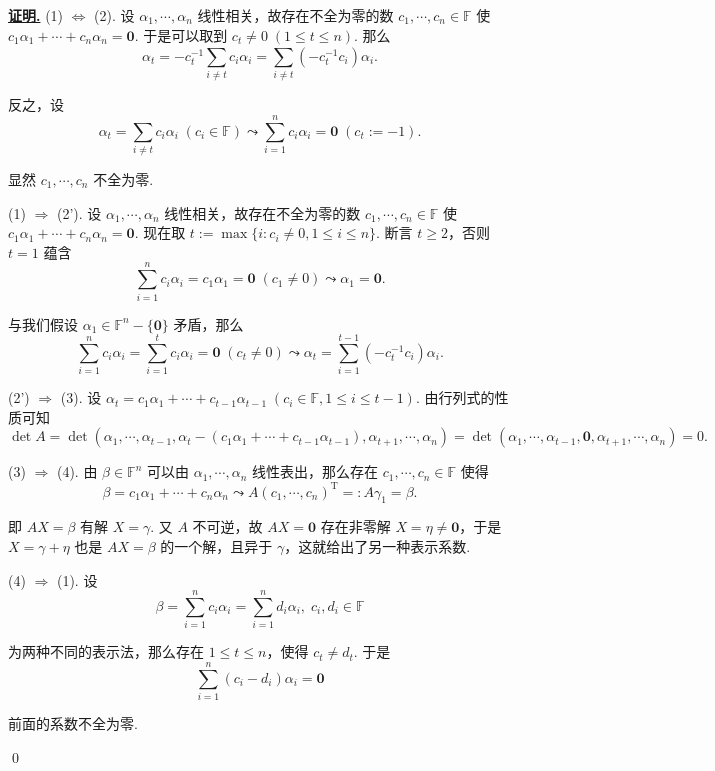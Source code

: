 \documentclass[10pt,openany]{article}
\theoremstyle{thmstyle} %
\theoremstyle{defstyle} %
\theoremstyle{prostyle} %
\theoremstyle{exastyle}
\theoremstyle{remstyle}
\renewenvironment{proof}[1][证明]{\par\underline{\textbf{#1.}} \;\fangsong}{\qed\par}
\newcommand{\T}{^{\text{T}}}
\newcommand{\F}{\mathbb{F}}
\begin{document}
\begin{proof}
	(1) \( \Leftrightarrow \) (2). 设 \( \alpha_1,\cdots,\alpha_n \) 线性相关，故存在不全为零的数 \( c_1,\cdots,c_n \in \F \) 使 \( c_1\alpha_1+\cdots+c_n\alpha_n= \bm{0} \). 于是可以取到 \( c_t \neq 0 \; (1 \leq t \leq n) \). 那么
	\[ \alpha_t= -c_t^{-1} \sum_{i \neq t}^{} c_i\alpha_i= \sum_{i \neq t}^{} (-c_t^{-1}c_i) \alpha_i. \]
	
	反之，设 
	\[ \alpha_t=\sum_{i \neq t}^{} c_i\alpha_i \; (c_i \in \F) \leadsto \sum_{i=1}^{n} c_i\alpha_i=\bm{0} \; (c_t:=-1). \]
	
	显然 \( c_1,\cdots,c_n \) 不全为零.
	
	\vspace{1ex}
	
	(1) \( \Rightarrow \) (2'). 设 \( \alpha_1,\cdots,\alpha_n \) 线性相关，故存在不全为零的数 \( c_1,\cdots,c_n \in \F \) 使 \( c_1\alpha_1+\cdots+c_n\alpha_n= \bm{0} \). 现在取 \( t:=\max\{i: c_i \neq 0, 1 \leq i \leq n\} \). 断言 \( t \geq 2 \)，否则 \( t=1 \) 蕴含
	\[ \sum_{i=1}^{n} c_i\alpha_i= c_1\alpha_1=\bm{0} \; (c_1 \neq 0) \leadsto \alpha_1=\bm{0}. \]
	
	与我们假设 \(\alpha_1 \in \F^n-\{\bm{0}\} \) 矛盾，那么 
	\[ \sum_{i=1}^{n} c_i\alpha_i=\sum_{i=1}^{t} c_i\alpha_i=\bm{0} \; (c_t \neq 0) \leadsto \alpha_t= \sum_{i=1}^{t-1} (-c_{t}^{-1}c_i)\alpha_i. \]
	
	(2') \( \Rightarrow \) (3). 设 \( \alpha_t=c_1\alpha_1+\cdots+c_{t-1}\alpha_{t-1} \; (c_i \in \F, 1\leq i \leq t-1) \). 由行列式的性质可知
	\[ \det A= \det(\alpha_1,\cdots,\alpha_{t-1},\alpha_t-(c_1\alpha_1+\cdots+c_{t-1}\alpha_{t-1}),\alpha_{t+1},\cdots,\alpha_n)=\det(\alpha_1,\cdots,\alpha_{t-1},\bm{0},\alpha_{t+1},\cdots,\alpha_n)=0. \]
	
	(3) \( \Rightarrow \) (4). 由  \( \beta \in \F^n \) 可以由 \( \alpha_1,\cdots,\alpha_n \) 线性表出，那么存在 \( c_1,\cdots,c_n \in \F \) 使得 
	\[ \beta=c_1\alpha_1+\cdots+c_n\alpha_n \leadsto A(c_1,\cdots,c_n)\T=:A\gamma_1=\beta. \]
	
	即 \( AX=\beta \) 有解 \( X=\gamma \). 又 \( A \) 不可逆，故 \( AX=\bm{0} \) 存在非零解 \( X=\eta \neq \bm{0} \)，于是 \( X=\gamma+\eta \) 也是 \( AX=\beta \) 的一个解，且异于 \( \gamma \)，这就给出了另一种表示系数.
	
	(4) \( \Rightarrow \) (1). 设 
	\[ \beta=\sum_{i=1}^{n} c_i\alpha_i= \sum_{i=1}^{n} d_i\alpha_i, \; c_i,d_i \in \F \]
	
	为两种不同的表示法，那么存在 \( 1 \leq t \leq n \)，使得 \( c_t \neq d_t \). 于是
	\[ \sum_{i=1}^{n} (c_i-d_i)\alpha_i= \bm{0} \]
	
	前面的系数不全为零.
	
\end{proof}
\end{document}
